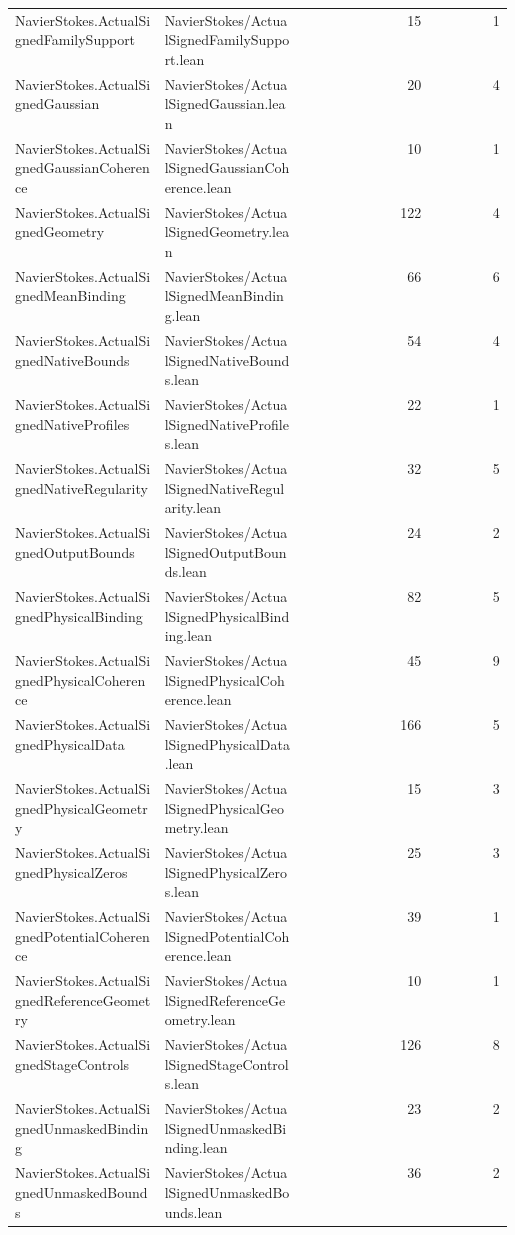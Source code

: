\begin{longtable}{p{0.30\linewidth}p{0.28\linewidth}rr}
NavierStokes.ActualSignedFamilySupport & NavierStokes/ActualSignedFamilySupport.lean & 15 & 1\\
NavierStokes.ActualSignedGaussian & NavierStokes/ActualSignedGaussian.lean & 20 & 4\\
NavierStokes.ActualSignedGaussianCoherence & NavierStokes/ActualSignedGaussianCoherence.lean & 10 & 1\\
NavierStokes.ActualSignedGeometry & NavierStokes/ActualSignedGeometry.lean & 122 & 4\\
NavierStokes.ActualSignedMeanBinding & NavierStokes/ActualSignedMeanBinding.lean & 66 & 6\\
NavierStokes.ActualSignedNativeBounds & NavierStokes/ActualSignedNativeBounds.lean & 54 & 4\\
NavierStokes.ActualSignedNativeProfiles & NavierStokes/ActualSignedNativeProfiles.lean & 22 & 1\\
NavierStokes.ActualSignedNativeRegularity & NavierStokes/ActualSignedNativeRegularity.lean & 32 & 5\\
NavierStokes.ActualSignedOutputBounds & NavierStokes/ActualSignedOutputBounds.lean & 24 & 2\\
NavierStokes.ActualSignedPhysicalBinding & NavierStokes/ActualSignedPhysicalBinding.lean & 82 & 5\\
NavierStokes.ActualSignedPhysicalCoherence & NavierStokes/ActualSignedPhysicalCoherence.lean & 45 & 9\\
NavierStokes.ActualSignedPhysicalData & NavierStokes/ActualSignedPhysicalData.lean & 166 & 5\\
NavierStokes.ActualSignedPhysicalGeometry & NavierStokes/ActualSignedPhysicalGeometry.lean & 15 & 3\\
NavierStokes.ActualSignedPhysicalZeros & NavierStokes/ActualSignedPhysicalZeros.lean & 25 & 3\\
NavierStokes.ActualSignedPotentialCoherence & NavierStokes/ActualSignedPotentialCoherence.lean & 39 & 1\\
NavierStokes.ActualSignedReferenceGeometry & NavierStokes/ActualSignedReferenceGeometry.lean & 10 & 1\\
NavierStokes.ActualSignedStageControls & NavierStokes/ActualSignedStageControls.lean & 126 & 8\\
NavierStokes.ActualSignedUnmaskedBinding & NavierStokes/ActualSignedUnmaskedBinding.lean & 23 & 2\\
NavierStokes.ActualSignedUnmaskedBounds & NavierStokes/ActualSignedUnmaskedBounds.lean & 36 & 2\\

\end{longtable}
